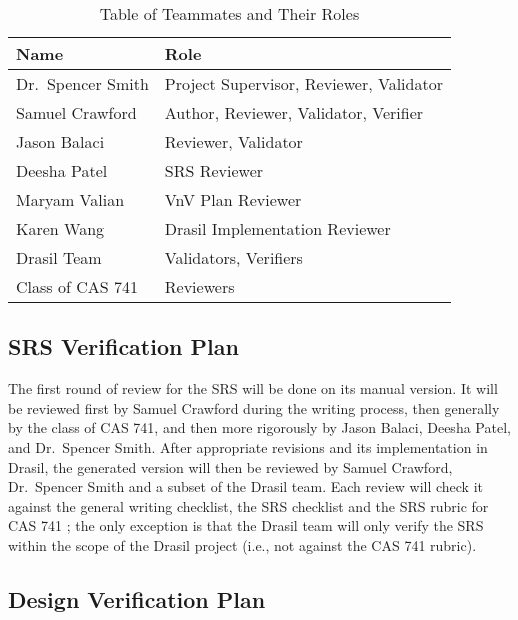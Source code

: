 \documentclass[12pt, titlepage]{article}
\begin{document}
\begin{table}[h!]
  \centering
  \begin{tabular}{| l | l |}
    \hline
    \rowcolor[gray]{0.9}
    \bf Name          & \bf Role                                \\
    \hline
    Dr.~Spencer Smith & Project Supervisor, Reviewer, Validator \\
    \hline
    Samuel Crawford   & Author, Reviewer, Validator, Verifier   \\
    \hline
    Jason Balaci      & Reviewer, Validator                     \\
    \hline
    Deesha Patel      & SRS Reviewer                            \\
    \hline
    Maryam Valian     & VnV Plan Reviewer                       \\
    \hline
    Karen Wang        & Drasil Implementation Reviewer          \\
    \hline
    Drasil Team       & Validators, Verifiers                   \\
    \hline
    Class of CAS 741  & Reviewers                               \\
    \hline
  \end{tabular}
  \caption{Table of Teammates and Their Roles}
  \label{table_team}
\end{table}

\subsection{SRS Verification Plan} \label{sec_srs_verif_plan}

The first round of review for the SRS will be done on its manual version.
It will be reviewed first by Samuel Crawford during the writing process, then
generally by the class of CAS 741, and then more rigorously by Jason Balaci,
Deesha Patel, and Dr.~Spencer Smith. After appropriate revisions and its
implementation in Drasil, the generated version will then be reviewed by Samuel
Crawford, Dr.~Spencer Smith and a subset of the Drasil team. Each review will
check it against the general writing checklist, the SRS checklist and the SRS
rubric for CAS 741 ; the only exception is that the Drasil team
will only verify the SRS
within the scope of the Drasil project (i.e., not against the CAS 741 rubric).

\subsection{Design Verification Plan}
\end{document}
